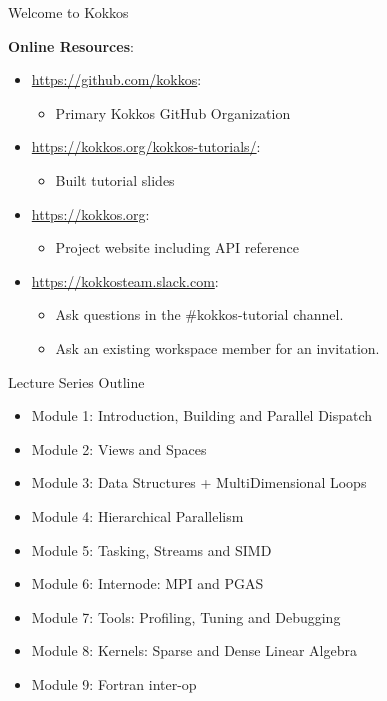\begin{frame}{Welcome to Kokkos}

\textbf{Online Resources}:

\begin{itemize}
	\item \url{https://github.com/kokkos}: 
		\begin{itemize}
			\item Primary Kokkos GitHub Organization
		\end{itemize}
	\item \url{https://kokkos.org/kokkos-tutorials/}:
		\begin{itemize}
			\item Built tutorial slides
		\end{itemize}
	\item \url{https://kokkos.org}:
		\begin{itemize}
			\item Project website including API reference
		\end{itemize}
	\item \url{https://kokkosteam.slack.com}:
		\begin{itemize}
			\item Ask questions in the \#kokkos-tutorial channel.
			\item Ask an existing workspace member for an invitation.
		\end{itemize}
\end{itemize}

\end{frame}



\iffull
\begin{frame}{Lecture Series Outline}

\begin{itemize}
	\item Module 1: Introduction, Building and Parallel Dispatch
	\item Module 2: Views and Spaces
	\item Module 3: Data Structures + MultiDimensional Loops
	\item Module 4: Hierarchical Parallelism
	\item Module 5: Tasking, Streams and SIMD
	\item Module 6: Internode: MPI and PGAS
	\item Module 7: Tools: Profiling, Tuning and Debugging
	\item Module 8: Kernels: Sparse and Dense Linear Algebra
    \item Module 9: Fortran inter-op
\end{itemize}
\end{frame}
\fi

